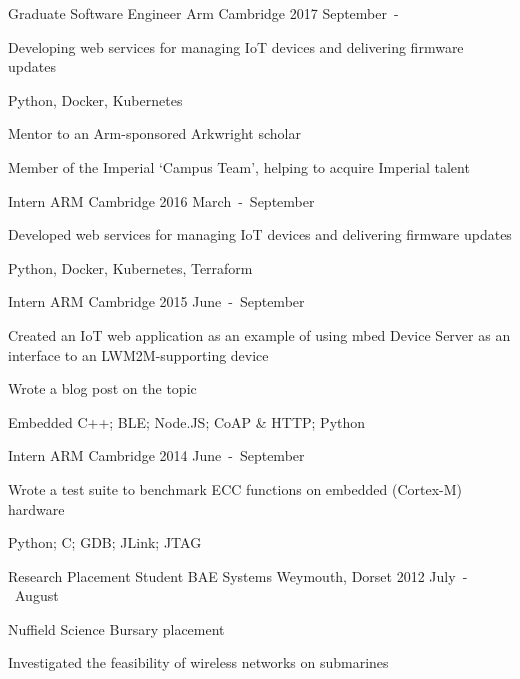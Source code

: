 \begin{cventries}

\cventry
  {Graduate Software Engineer}
  {Arm}
  {Cambridge}
  {2017 September~-}
  {\begin{cvitems}
    \item {Developing web services for managing IoT devices and delivering firmware updates}
    \item {Python, Docker, Kubernetes}
    \item {Mentor to an Arm-sponsored Arkwright scholar}
    \item {Member of the Imperial `Campus Team', helping to acquire Imperial talent}
  \end{cvitems}}

\cventry
  {Intern}
  {ARM}
  {Cambridge}
  {2016 March~-~September}
  {\begin{cvitems}
    \item {Developed web services for managing IoT devices and delivering firmware updates}
    \item {Python, Docker, Kubernetes, Terraform}
  \end{cvitems}}

\cventry
  {Intern}
  {ARM}
  {Cambridge}
  {2015 June~-~September}
  {\begin{cvitems}
    \item {Created an IoT web application as an example of using mbed Device Server as an interface to an LWM2M-supporting device}
    \item {Wrote a blog post on the topic}
    \item {Embedded C++; BLE; Node.JS; CoAP \& HTTP; Python}
  \end{cvitems}}

\cventry
  {Intern}
  {ARM}
  {Cambridge}
  {2014 June~-~September}
  {\begin{cvitems}
    \item {Wrote a test suite to benchmark ECC functions on embedded (Cortex-M) hardware}
    \item {Python; C; GDB; JLink; JTAG}
  \end{cvitems}}

\cventry
  {Research Placement Student}
  {BAE Systems}
  {Weymouth, Dorset}
  {2012 July~-~August}
  {\begin{cvitems}
    \item {Nuffield Science Bursary placement}
    \item {Investigated the feasibility of wireless networks on submarines}
  \end{cvitems}}

\end{cventries}
